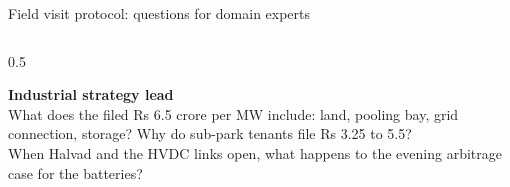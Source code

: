 \documentclass[aspectratio=169,10pt,t]{beamer}
\begin{document}
\begin{frame}{Field visit protocol: questions for domain experts}
\begin{columns}[T]
\begin{column}{0.5\textwidth}
\begin{tcolorbox}[colback=white,colframe=Grey,arc=3pt,left=2.5mm,right=2.5mm,top=1mm,bottom=1mm,boxsep=0.5mm]
      \end{tcolorbox}
      \begin{tcolorbox}[colback=white,colframe=Grey,arc=3pt,left=2.5mm,right=2.5mm,top=1mm,bottom=1mm,boxsep=0.5mm]
        {\footnotesize\textbf{Industrial strategy lead}}\\[2pt]
        {\scriptsize
        What does the filed Rs 6.5 crore per MW include: land, pooling bay, grid connection, storage? Why do sub-park tenants file Rs 3.25 to 5.5?\\[2pt]
        When Halvad and the HVDC links open, what happens to the evening arbitrage case for the batteries?}
      \end{tcolorbox}
    \end{column}
  \end{columns}
\end{frame}
\end{document}
